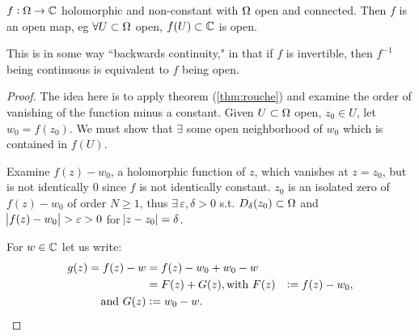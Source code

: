 \begin{theorem}\label{thm:open-mapping}
$f:\Omega \rightarrow \mathbb{C}$ holomorphic and non-constant with $\Omega$ open and connected. Then $f$ is an open map, eg $\forall U \subset \Omega$ open, $f(U) \subset \mathbb{C}$ is open.
\end{theorem}


\begin{note}
This is in some way ``backwards continuity," in that if $f$ is invertible, then $f^{-1}$ being continuous is equivalent to $f$ being open.
\end{note}

\begin{proof}
The idea here is to apply theorem (\ref{thm:rouche}) and examine the order of vanishing of the function minus a constant. Given $U \subset \Omega$ open, $z_0 \in U$, let $w_0 = f(z_0)$. We must show that $ \exists $ some open neighborhood of $w_0$ which is contained in $f(U)$.

Examine $f(z) - w_0$, a holomorphic function of $z$, which vanishes at $z=z_0$, but is not identically $0$ since $f$ is not identically constant. $z_0$ is an isolated zero of $f(z) - w_0$ of order $N \geq 1$, thus $\exists \, \varepsilon,\delta > 0$ s.t. $D_\delta (z_0) \subset \Omega$ and $\abs{f(z)-w_0} > \varepsilon> 0 $ for $\abs{z-z_0} = \delta$.



\begin{center}

\end{center}



For $w \in \mathbb{C}$ let us write:
\begin{align*}
g(z) = f(z) - w &= f(z) - w_0 +w_0 -w\\
&=F(z) + G(z),
\text{with } F(z) &\vcentcolon= f(z) - w_0,\\
\text{and } G(z) &\vcentcolon= w_0 - w.
\end{align*}


\end{proof}

